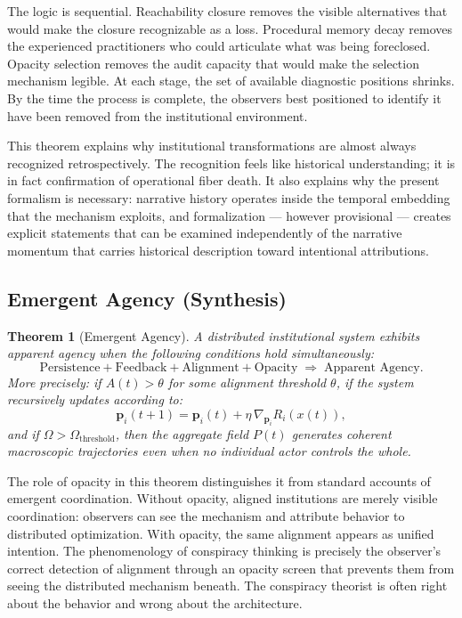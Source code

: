 \documentclass[12pt, a4paper]{article}
\theoremstyle{named}
\newtheorem{theorem}{Theorem}
\begin{document}
The logic is sequential. Reachability closure removes the visible
alternatives that would make the closure recognizable as a loss.
Procedural memory decay removes the experienced practitioners who could
articulate what was being foreclosed. Opacity selection removes the
audit capacity that would make the selection mechanism legible. At each
stage, the set of available diagnostic positions shrinks. By the time
the process is complete, the observers best positioned to identify it
have been removed from the institutional environment.

This theorem explains why institutional transformations are almost
always recognized retrospectively. The recognition feels like
historical understanding; it is in fact confirmation of operational
fiber death. It also explains why the present formalism is necessary:
narrative history operates inside the temporal embedding that the
mechanism exploits, and formalization — however provisional — creates
explicit statements that can be examined independently of the narrative
momentum that carries historical description toward intentional
attributions.

\subsection{Emergent Agency (Synthesis)}

\begin{theorem}[Emergent Agency]
A distributed institutional system exhibits apparent agency when the
following conditions hold simultaneously:
\[
  \text{Persistence} + \text{Feedback} + \text{Alignment}
  + \text{Opacity}
  \;\Longrightarrow\; \text{Apparent Agency.}
\]
More precisely: if $A(t) > \theta$ for some alignment threshold
$\theta$, if the system recursively updates according to:
\[
  \mathbf{p}_i(t+1)
  = \mathbf{p}_i(t)
  + \eta\,\nabla_{\mathbf{p}_i} R_i(x(t)),
\]
and if $\Omega > \Omega_{\text{threshold}}$, then the aggregate field
$P(t)$ generates coherent macroscopic trajectories even when no
individual actor controls the whole.
\end{theorem}

The role of opacity in this theorem distinguishes it from standard
accounts of emergent coordination. Without opacity, aligned institutions
are merely visible coordination: observers can see the mechanism and
attribute behavior to distributed optimization. With opacity, the same
alignment appears as unified intention. The phenomenology of conspiracy
thinking is precisely the observer's correct detection of alignment
through an opacity screen that prevents them from seeing the distributed
mechanism beneath. The conspiracy theorist is often right about the
behavior and wrong about the architecture.
\end{document}

